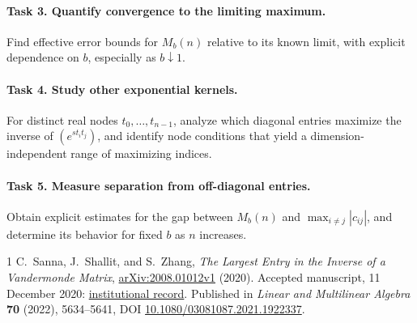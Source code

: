 \documentclass[10pt]{article}
\begin{document}
\paragraph{Task 3. Quantify convergence to the limiting maximum.}
Find effective error bounds for \(M_b(n)\) relative to its known limit,
with explicit dependence on \(b\), especially as \(b\downarrow1\).

\paragraph{Task 4. Study other exponential kernels.}
For distinct real nodes \(t_0,\ldots,t_{n-1}\), analyze which diagonal
entries maximize the inverse of \((e^{s t_i t_j})\), and identify node
conditions that yield a dimension-independent range of maximizing indices.

\paragraph{Task 5. Measure separation from off-diagonal entries.}
Obtain explicit estimates for the gap between \(M_b(n)\) and
\(\max_{i\ne j}|c_{ij}|\), and determine its behavior for fixed \(b\)
as \(n\) increases.

\begin{thebibliography}{1}
C.~Sanna, J.~Shallit, and S.~Zhang,
\emph{The Largest Entry in the Inverse of a Vandermonde Matrix},
\href{https://arxiv.org/abs/2008.01012}{arXiv:2008.01012v1} (2020).
Accepted manuscript, 11 December 2020:
\href{https://iris.polito.it/handle/11583/2898892}{institutional record}.
Published in \emph{Linear and Multilinear Algebra} \textbf{70} (2022),
5634--5641, DOI \href{https://doi.org/10.1080/03081087.2021.1922337}
{10.1080/03081087.2021.1922337}.
\end{thebibliography}
\end{document}
